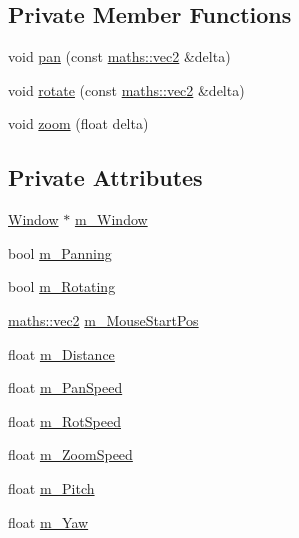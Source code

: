 \subsection*{Private Member Functions}
\begin{DoxyCompactItemize}
\item 
void \hyperlink{classspork_1_1graphics_1_1_model_cam_a65f1646db38f6b616c34ddcb9d83b83b}{pan} (const \hyperlink{structspork_1_1maths_1_1vec2}{maths\+::vec2} \&delta)
\item 
void \hyperlink{classspork_1_1graphics_1_1_model_cam_a5d8bb1b2b47c2dff072b1033ab282d3e}{rotate} (const \hyperlink{structspork_1_1maths_1_1vec2}{maths\+::vec2} \&delta)
\item 
void \hyperlink{classspork_1_1graphics_1_1_model_cam_a8d02d2f6a9f92bce945f9ce0a0f75a02}{zoom} (float delta)
\end{DoxyCompactItemize}
\subsection*{Private Attributes}
\begin{DoxyCompactItemize}
\item 
\hyperlink{classspork_1_1graphics_1_1_window}{Window} $\ast$ \hyperlink{classspork_1_1graphics_1_1_model_cam_ae087fc0f2f0cf19009ee2cbbb87137ac}{m\+\_\+\+Window}
\item 
bool \hyperlink{classspork_1_1graphics_1_1_model_cam_a9a2893538207b486954d7e6efc6f3b81}{m\+\_\+\+Panning}
\item 
bool \hyperlink{classspork_1_1graphics_1_1_model_cam_a161388ef4b069c8f27f920577122f069}{m\+\_\+\+Rotating}
\item 
\hyperlink{structspork_1_1maths_1_1vec2}{maths\+::vec2} \hyperlink{classspork_1_1graphics_1_1_model_cam_a99b8dc6717b01a77acc6309fffecab13}{m\+\_\+\+Mouse\+Start\+Pos}
\item 
float \hyperlink{classspork_1_1graphics_1_1_model_cam_a67ee403829d2456f05d871ddd4c2a38c}{m\+\_\+\+Distance}
\item 
float \hyperlink{classspork_1_1graphics_1_1_model_cam_aace836b7d40f91d5aa0b914c3297f748}{m\+\_\+\+Pan\+Speed}
\item 
float \hyperlink{classspork_1_1graphics_1_1_model_cam_a44635899e72f7450f03bb2c34ff96a09}{m\+\_\+\+Rot\+Speed}
\item 
float \hyperlink{classspork_1_1graphics_1_1_model_cam_ae8efa38634c73e83df6469c3707206ab}{m\+\_\+\+Zoom\+Speed}
\item 
float \hyperlink{classspork_1_1graphics_1_1_model_cam_aedfb55bbce1cb27ea7115a1a7adc3a89}{m\+\_\+\+Pitch}
\item 
float \hyperlink{classspork_1_1graphics_1_1_model_cam_a1c36375d7cce22f4d47666d70b23545d}{m\+\_\+\+Yaw}
\end{DoxyCompactItemize}

